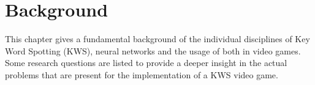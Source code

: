 
\chapter{Background}\label{sec:back}
\thesisStateReady
This chapter gives a fundamental background of the individual disciplines of Key Word Spotting (KWS), neural networks and the usage of both in video games.
Some research questions are listed to provide a deeper insight in the actual problems that are present for the implementation of a KWS video game.





